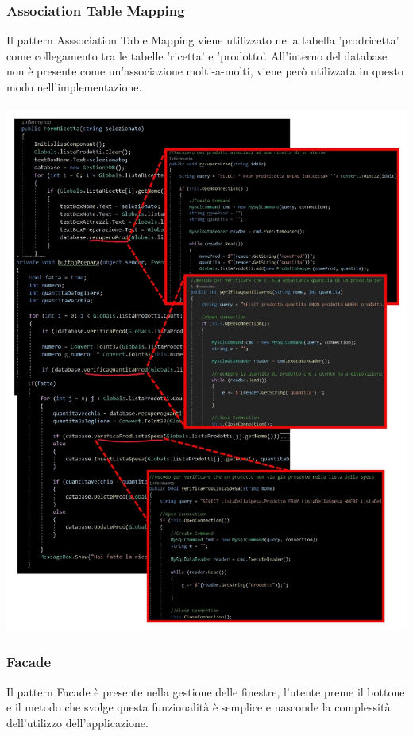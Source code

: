 \documentclass[a4paper, titlepage]{article}
\begin{document}
\subsubsection{Association Table Mapping}
Il pattern Asssociation Table Mapping viene utilizzato nella tabella 'prodricetta' come collegamento tra le tabelle 'ricetta' e 'prodotto'. All'interno del database non è presente come un'associazione molti-a-molti, viene però utilizzata in questo modo nell'implementazione.\\\\ 
\includegraphics[scale=0.40]{Immagini/AssociationTableMapping_.jpg}
\subsubsection{Facade}
Il pattern Facade è presente nella gestione delle finestre, l'utente preme il bottone e il metodo che svolge questa funzionalità è semplice e nasconde la complessità dell'utilizzo dell'applicazione.
\newpage
\end{document}
